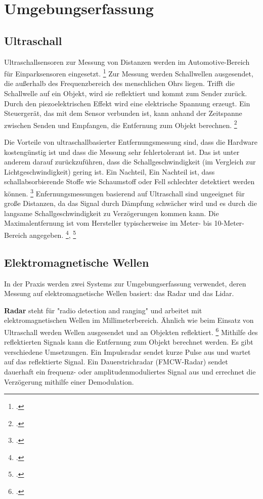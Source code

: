 	\section{Umgebungserfassung}\label{section:Umgebungserfassung}
		\subsection{Ultraschall}
			Ultraschallsensoren zur Messung von Distanzen werden im Automotive-Bereich für Einparksensoren eingesetzt. \footcite[Vgl.][]{ChenXiao2009Parking} Zur Messung werden Schallwellen ausgesendet, die außerhalb des Frequenzbereich des menschlichen Ohrs liegen. Trifft die Schallwelle auf ein Objekt, wird sie reflektiert und kommt zum Sender zurück. Durch den piezoelektrischen Effekt wird eine elektrische Spannung erzeugt. Ein Steuergerät, das mit dem Sensor verbunden ist, kann anhand der Zeitspanne zwischen Senden und Empfangen, die Entfernung zum Objekt berechnen. \footcite[Vgl.][S. 244, S. 252]{Winner2015Fahrerassistenz}
		
			Die Vorteile von ultraschallbasierter Entfernungsmessung sind, dass die Hardware kostengünstig ist und dass die Messung sehr fehlertolerant ist. Das ist unter anderem darauf zurückzuführen, dass die Schallgeschwindigkeit (im Vergleich zur Lichtgeschwindigkeit) gering ist. Ein Nachteil, Ein Nachteil ist, dass schallabsorbierende Stoffe wie Schaumstoff oder Fell schlechter detektiert werden können. \footcite[Vgl.][S. 256f]{Winner2015Fahrerassistenz} 
			Enfernungsmessungen basierend auf Ultraschall sind ungeeignet für große Distanzen, da das Signal durch Dämpfung schwächer wird und es durch die langsame Schallgeschwindigkeit zu Verzögerungen kommen kann. Die Maximalentfernung ist vom Hersteller typischerweise im Meter- bis 10-Meter-Bereich angegeben. \footcite[Vgl.][]{Sparkfun2022Sensor}, \footcite[Vgl.][]{APG2022Sensor}
		\subsection{Elektromagnetische Wellen}
			In der Praxis werden zwei Systems zur Umgebungserfassung verwendet, deren Messung auf elektromagnetische Wellen basiert: das Radar und das Lidar.
			
			\textbf{Radar} steht für "radio detection and ranging" und arbeitet mit elektromagnetischen Wellen im Millimeterbereich. Ähnlich wie beim Einsatz von Ultraschall werden Wellen ausgesendet und an Objekten reflektiert. \footcite[Vgl.][S. 260, S. 264-267]{Winner2015Fahrerassistenz} Mithilfe des reflektierten Signals kann die Entfernung zum Objekt berechnet werden. Es gibt verschiedene Umsetzungen. Ein Impulsradar sendet kurze Pulse aus und wartet auf das reflektierte Signal. Ein Dauerstrichradar (FMCW-Radar) sendet dauerhaft ein frequenz- oder amplitudenmoduliertes Signal aus und errechnet die Verzögerung mithilfe einer Demodulation.
			
